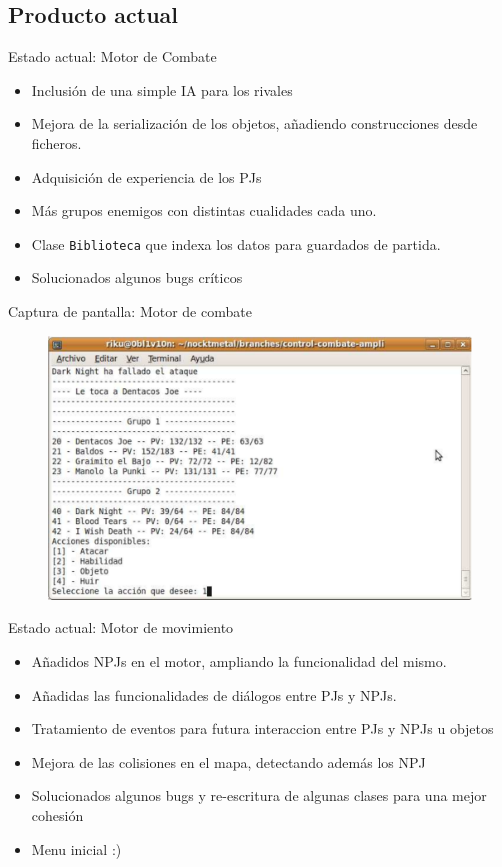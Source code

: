 \documentclass[9pt,xcolor=svgnames]{beamer}
\begin{document}
   \subsection{Producto actual}

   \begin{frame}{Estado actual: Motor de Combate}
    \begin{itemize}
     \item Inclusión de una simple IA para los rivales
     \item Mejora de la serialización de los objetos, añadiendo
	   construcciones desde ficheros.
     \item Adquisición de experiencia de los PJs
     \item Más grupos enemigos con distintas cualidades cada uno.
     \item Clase \texttt{Biblioteca} que indexa los datos para 
	   guardados de partida.
     \item Solucionados algunos bugs críticos
    \end{itemize}
   \end{frame}

   \begin{frame}{Captura de pantalla: Motor de combate}
   \begin{figure}[t]
    \includegraphics[scale=0.35]{./Imagenes/combate.pdf}
   \end{figure}    
   \end{frame}

   \begin{frame}{Estado actual: Motor de movimiento}
    \begin{itemize}
     \item Añadidos NPJs en el motor, ampliando la funcionalidad del mismo.
     \item Añadidas las funcionalidades de diálogos entre PJs y NPJs.
     \item Tratamiento de eventos para futura interaccion entre PJs y
	   NPJs u objetos
     \item Mejora de las colisiones en el mapa, detectando además los NPJ
     \item Solucionados algunos bugs y re-escritura de algunas clases
	   para una mejor cohesión
     \item Menu inicial :)
    \end{itemize}
   \end{frame}
\end{document}
